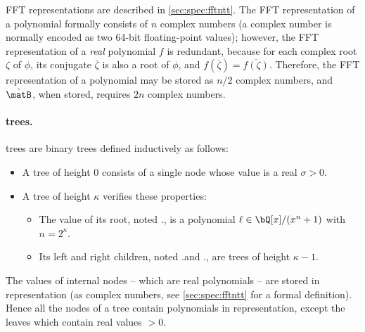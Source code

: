FFT representations are described in \cref{sec:spec:fftntt}. The
FFT representation of a polynomial formally consists of $n$ complex
numbers (a complex number is normally encoded as two 64-bit
floating-point values); however, the FFT representation of a \emph{real}
polynomial $f$ is redundant, because for each complex root $\zeta$ of
$\phi$, its conjugate $\overline{\zeta}$ is also a root of $\phi$, and
$f(\overline{\zeta}) = \overline{f(\zeta)}$. Therefore, the FFT
representation of a polynomial may be stored as $n/2$ complex numbers,
and $\hat \matB$, when stored, requires $2n$ complex numbers.

\paragraph{\falcon trees.} \falcon trees are binary trees defined inductively as follows:
\begin{itemize}
 \item A \falcon tree \tree of height $0$ consists of a single node whose value is a real $\sigma > 0$.
 \item A \falcon tree \tree of height $\kappa$ verifies these properties:
 \begin{itemize}
  \item The value of its root, noted \tree.\data, is a polynomial $\ell \in \bQ[x]/(x^n+1)$ with $n = 2^\kappa$.
  \item Its left and right children, noted \tree.\lchild and \tree.\rchild, are \falcon trees of height $\kappa-1$.
 \end{itemize}
\end{itemize}
 The values of internal nodes -- which are real polynomials -- are stored in \fft representation (\ie as complex numbers, see \cref{sec:spec:fftntt} for a formal definition). Hence all the nodes of a \falcon tree contain polynomials in \fft representation, except the leaves which contain real values $>0$.
 
